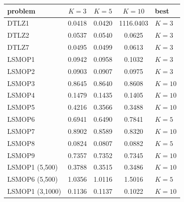 \footnotesize
\setlength{\tabcolsep}{6pt}
\begin{tabular}{lcccl}
\toprule
problem & $K{=}3$ & $K{=}5$ & $K{=}10$ & best \\
\midrule
DTLZ1 & 0.0418 & 0.0420 & 1116.0403 & $K{=}3$ \\
DTLZ2 & 0.0537 & 0.0540 & 0.0625 & $K{=}3$ \\
DTLZ7 & 0.0495 & 0.0499 & 0.0613 & $K{=}3$ \\
LSMOP1 & 0.0942 & 0.0958 & 0.1032 & $K{=}3$ \\
LSMOP2 & 0.0903 & 0.0907 & 0.0975 & $K{=}3$ \\
LSMOP3 & 0.8645 & 0.8640 & 0.8608 & $K{=}10$ \\
LSMOP4 & 0.1479 & 0.1435 & 0.1405 & $K{=}10$ \\
LSMOP5 & 0.4216 & 0.3566 & 0.3488 & $K{=}10$ \\
LSMOP6 & 0.6941 & 0.6490 & 0.7841 & $K{=}5$ \\
LSMOP7 & 0.8902 & 0.8589 & 0.8320 & $K{=}10$ \\
LSMOP8 & 0.0824 & 0.0807 & 0.0882 & $K{=}5$ \\
LSMOP9 & 0.7357 & 0.7352 & 0.7345 & $K{=}10$ \\
LSMOP1 (5,500) & 0.3788 & 0.3515 & 0.3486 & $K{=}10$ \\
LSMOP6 (5,500) & 1.0356 & 1.0116 & 1.5016 & $K{=}5$ \\
LSMOP1 (3,1000) & 0.1136 & 0.1137 & 0.1022 & $K{=}10$ \\
\bottomrule
\end{tabular}

